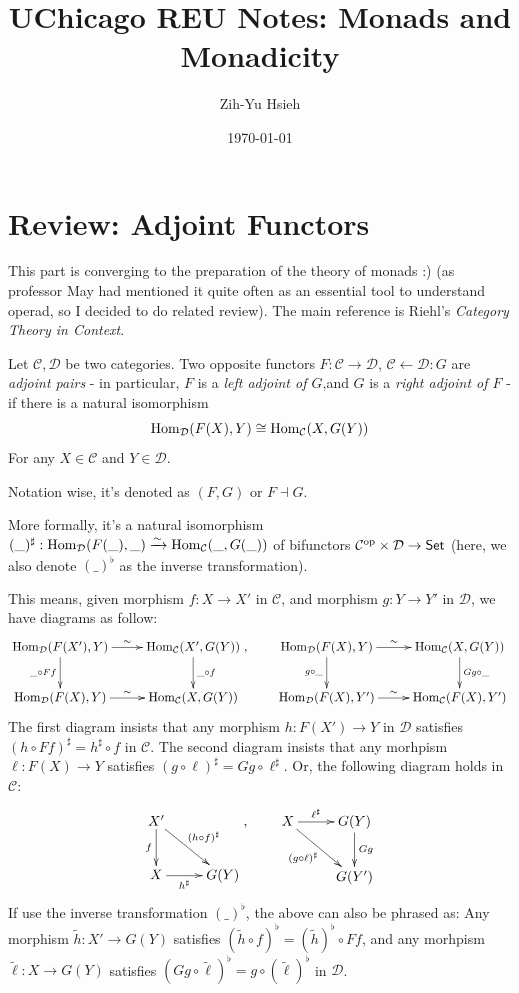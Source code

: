 \documentclass{article}
\title{UChicago REU Notes: Monads and Monadicity}
\author{Zih-Yu Hsieh}
\date{\today}
\begin{document}
\maketitle
\tableofcontents

\section{Review: Adjoint Functors}

This part is converging to the preparation of the theory of monads :) (as professor May had mentioned it quite often as an essential tool to understand operad, so I decided to do related review). The main reference is Riehl's \emph{Category Theory in Context}.

\begin{defn}
    Let $\mathcal{C},\mathcal{D}$ be two categories. Two opposite functors $F:\mathcal{C}\rightarrow \mathcal{D}$, $\mathcal{C}\leftarrow \mathcal{D}:G$ are \emph{adjoint pairs} - in particular, $F$ is a \emph{left adjoint of $G$},and $G$ is a \emph{right adjoint of $F$} - if there is a natural isomorphism
    \[\mathrm{Hom}_\mathcal{D}(F(X),Y)\cong \mathrm{Hom}_\mathcal{C}(X,G(Y))\]
    For any $X\in\mathcal{C}$ and $Y\in\mathcal{D}$.

    Notation wise, it's denoted as $(F,G)$ or $F\dashv G$.
\end{defn}

More formally, it's a natural isomorphism $(\_)^\sharp:\mathrm{Hom}_\mathcal{D}(F(\_),\_)\xrightarrow{\sim}\mathrm{Hom}_\mathcal{C}(\_,G(\_))$ of bifunctors $\mathcal{C}^{\mathrm{op}}\times\mathcal{D}\rightarrow\mathsf{Set}$ (here, we also denote $(\_)^\flat$ as the inverse transformation). 

This means, given morphism $f:X\rightarrow X'$ in $\mathcal{C}$, and morphism $g:Y\rightarrow Y'$ in $\mathcal{D}$, we have diagrams as follow:
\[\xymatrix{
    \Hom_\mathcal{D}(F(X'),Y) \ar[d]_-{\_\circ Ff}\ar[r]^-{\sim} & \Hom_\mathcal{C}(X',G(Y)) \ar[d]^-{\_\circ f}\\
    \Hom_\mathcal{D}(F(X),Y)\ar[r]^-{\sim} & \Hom_\mathcal{C}(X,G(Y))
},\quad \quad \xymatrix{
    \Hom_\mathcal{D}(F(X),Y) \ar[d]_-{g\circ \_} \ar[r]^-{\sim} & \Hom_\mathcal{C}(X,G(Y)) \ar[d]^-{Gg\circ \_}\\
    \Hom_\mathcal{D}(F(X),Y')\ar[r]^-{\sim} & \Hom_\mathcal{C}(F(X),Y')
}\]
The first diagram insists that any morphism $h:F(X')\rightarrow Y$ in $\mathcal{D}$ satisfies $(h\circ Ff)^\sharp = h^\sharp \circ f$ in $\mathcal{C}$. The second diagram insists that any morhpism $\ell:F(X)\rightarrow Y$ satisfies $(g\circ \ell)^\sharp = Gg\circ \ell^\sharp$. Or, the following diagram holds in $\mathcal{C}$:
\[\xymatrix{
    X' \ar[d]_-{f} \ar[dr]^-{(h\circ f)^\sharp}\\
    X \ar[r]_-{h^\sharp} & G(Y)
},\quad\quad \xymatrix{
    X \ar[r]^-{\ell^\sharp} \ar[dr]_-{(g\circ \ell)^\sharp} & G(Y) \ar[d]^-{Gg}\\
    & G(Y')
}\]
If use the inverse transformation $(\_)^\flat$, the above can also be phrased as: Any morphism $\tilde{h}:X'\rightarrow G(Y)$ satisfies $(\tilde{h}\circ f)^\flat = (\tilde{h})^\flat \circ Ff$, and any morhpism $\tilde{\ell}:X\rightarrow G(Y)$ satisfies $(Gg\circ \tilde{\ell})^\flat = g\circ (\tilde{\ell})^\flat$ in $\mathcal{D}$.
\end{document}
